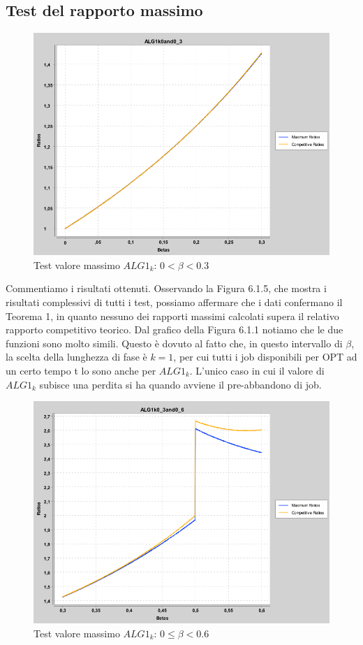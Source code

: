 \documentclass[twoside,openany,titlepage,fleqn,
	headinclude,12pt,a4paper,BCOR5mm,footinclude]{scrbook}
\begin{document}
\subsection{Test del rapporto massimo}
\setcounter{figure}{0} 
\begin{figure}[H]
\caption{Test valore massimo $ALG1_{k}$: $0 < \beta < 0.3$}
\centering
\includegraphics[scale=0.4]{max/ALG1k0and0_3.png}
\end{figure}
Commentiamo i risultati ottenuti. Osservando la Figura 6.1.5, che mostra i risultati complessivi di tutti i test, possiamo affermare che i dati confermano il Teorema 1, in quanto nessuno dei rapporti massimi calcolati supera il relativo rapporto competitivo teorico.
Dal grafico della Figura 6.1.1 notiamo che le due funzioni sono molto simili. Questo è dovuto al fatto che, in questo intervallo di $\beta$, la scelta della lunghezza di fase è $k=1$, per cui tutti i job disponibili per OPT ad un certo tempo t lo sono anche per $ALG1_{k}$. L'unico caso in cui il valore di $ALG1_{k}$ subisce una perdita si ha quando avviene il pre-abbandono di job.
\begin{figure}[H]
\caption{Test valore massimo $ALG1_{k}$: $0 \leq \beta < 0.6$}
\centering
\includegraphics[scale=0.4]{max/ALG1k0_3and0_6.png}
\end{figure}
\end{document}
